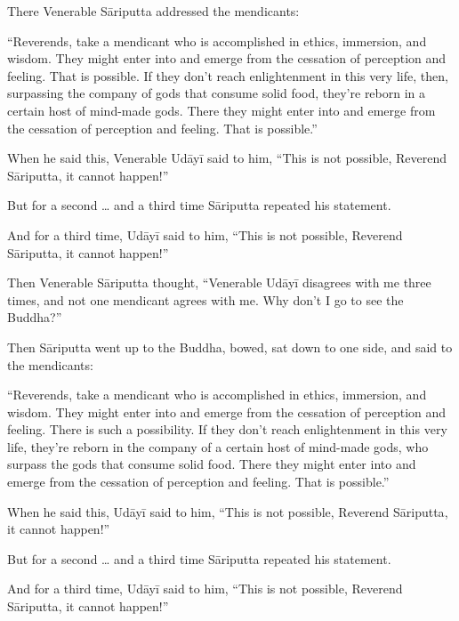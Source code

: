 \documentclass[12pt,openany]{book}%
\begin{document}
There Venerable \textsanskrit{Sāriputta} addressed the mendicants: 

“Reverends, take a mendicant who is accomplished in ethics, immersion, and wisdom. They might enter into and emerge from the cessation of perception and feeling. That is possible. If they don’t reach enlightenment in this very life, then, surpassing the company of gods that consume solid food, they’re reborn in a certain host of mind-made gods. There they might enter into and emerge from the cessation of perception and feeling. That is possible.” 

When he said this, Venerable \textsanskrit{Udāyī} said to him, “This is not possible, Reverend \textsanskrit{Sāriputta}, it cannot happen!” 

But for a second … and a third time \textsanskrit{Sāriputta} repeated his statement. 

And for a third time, \textsanskrit{Udāyī} said to him, “This is not possible, Reverend \textsanskrit{Sāriputta}, it cannot happen!” 

Then Venerable \textsanskrit{Sāriputta} thought, “Venerable \textsanskrit{Udāyī} disagrees with me three times, and not one mendicant agrees with me. Why don’t I go to see the Buddha?” 

Then \textsanskrit{Sāriputta} went up to the Buddha, bowed, sat down to one side, and said to the mendicants: 

“Reverends, take a mendicant who is accomplished in ethics, immersion, and wisdom. They might enter into and emerge from the cessation of perception and feeling. There is such a possibility. If they don’t reach enlightenment in this very life, they’re reborn in the company of a certain host of mind-made gods, who surpass the gods that consume solid food. There they might enter into and emerge from the cessation of perception and feeling. That is possible.” 

When he said this, \textsanskrit{Udāyī} said to him, “This is not possible, Reverend \textsanskrit{Sāriputta}, it cannot happen!” 

But for a second … and a third time \textsanskrit{Sāriputta} repeated his statement. 

And for a third time, \textsanskrit{Udāyī} said to him, “This is not possible, Reverend \textsanskrit{Sāriputta}, it cannot happen!” 
\end{document}
